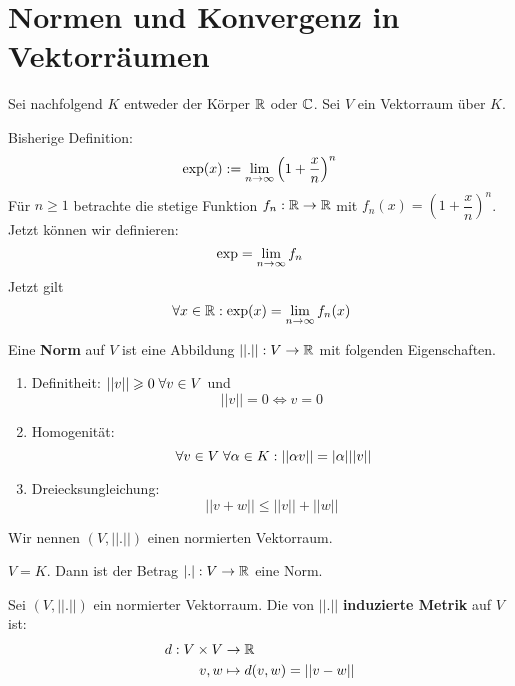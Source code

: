 \documentclass[main.tex]{subfiles}
\begin{document}
\section{Normen und Konvergenz in Vektorräumen}

\begin{Bemerkung}
  Sei nachfolgend $K$ entweder der Körper $\mathbb{R}$ oder $\mathbb{C}$. Sei $V$ ein Vektorraum über $K$.
\end{Bemerkung}

\begin{Bemerkung}
  Bisherige Definition:
  $$\exp(x) := \lim \limits_{n \to \infty} \left(1 + \dfrac{x}{n}\right)^n$$
  Für $n \geq 1$ betrachte die stetige Funktion $f_n : \mathbb{R} \to \mathbb{R}$ mit $f_n(x) = \left(1 + \dfrac{x}{n}\right)^n$. Jetzt können wir definieren:
  $$\exp = \lim \limits_{n \to \infty} f_n$$
  Jetzt gilt
  $$\;\forall x \in \mathbb{R} : \exp(x) = \lim \limits_{n \to \infty} f_n(x)$$
\end{Bemerkung}

\begin{Definition}[Norm]
  Eine \textbf{Norm} auf $V$ ist eine Abbildung $||.|| : V \to \mathbb{R}$ mit folgenden Eigenschaften.
  \begin{enumerate}
    \item Definitheit: $||v|| \geqslant 0 \;\forall v \in V$ und
      $$||v|| = 0 \Leftrightarrow v = 0$$
    \item Homogenität:
      $$\;\forall v \in V \;\forall \alpha \in K : ||\alpha v|| = |\alpha| ||v||$$
    \item Dreiecksungleichung:
      $$||v+w|| \leq ||v|| + ||w||$$
  \end{enumerate}
  Wir nennen $(V, ||.||)$ einen normierten Vektorraum.
\end{Definition}

\begin{Beispiel}
  $V = K$. Dann ist der Betrag $|.| : V \to \mathbb{R}$ eine Norm.
\end{Beispiel}

\begin{Definition}
  Sei $(V, ||.||)$ ein normierter Vektorraum. Die von $||.||$ \textbf{induzierte Metrik} auf $V$ ist:
  $$\begin{aligned}
    d : V\times V & \to \mathbb{R} \\
    v,w & \mapsto d(v,w) = ||v - w||
  \end{aligned}$$
\end{Definition}
\end{document}
